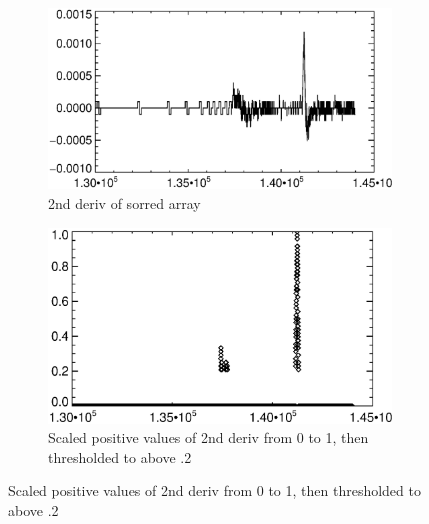 \documentclass[10pt]{scrartcl}
\begin{document}
\begin{figure}[!h]
    \begin{center}
    \begin{subfigure}[b]{.49\textwidth}
        \centering
        \includegraphics[width=1.\textwidth]{../plots_tables_images/reg12.eps}
        \caption{2nd deriv of sorred array}
        \label{reg12peaks}
    \end{subfigure}
    \begin{subfigure}[b]{.49\textwidth}
        \centering
        \includegraphics[width=1.\textwidth]{../plots_tables_images/scaledreg12.eps}
        \caption{Scaled positive values of 2nd deriv from 0 to 1, then thresholded to above .2}
        \label{scaled12peaks}
    \end{subfigure}


\end{center}
\end{figure}
\end{document}
